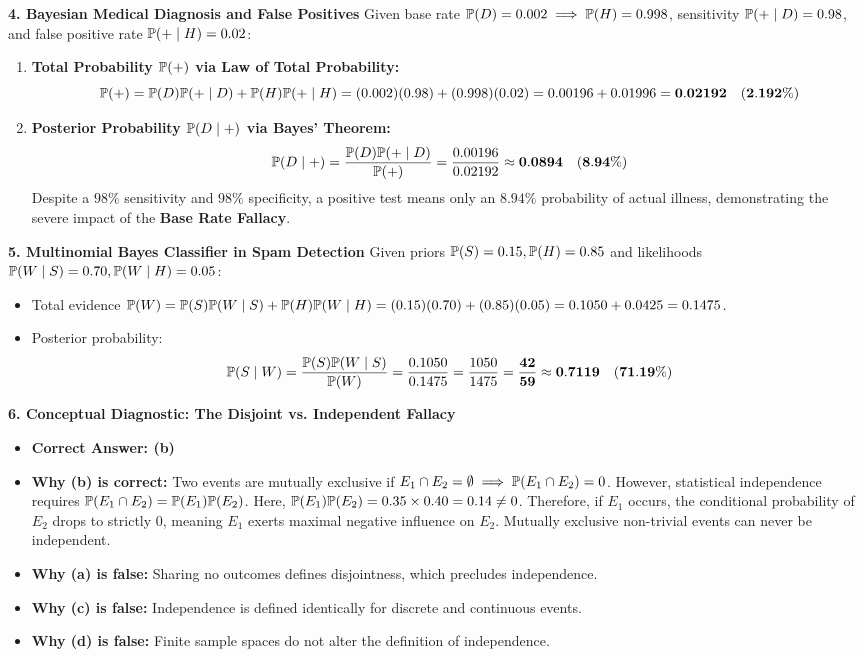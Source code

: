 \textbf{4. Bayesian Medical Diagnosis and False Positives}
Given base rate $\P(D) = 0.002 \implies \P(H) = 0.998$, sensitivity $\P(+ \mid D) = 0.98$, and false positive rate $\P(+ \mid H) = 0.02$:
\begin{enumerate}
    \item \textbf{Total Probability $\P(+)$ via Law of Total Probability:}
    $$\P(+) = \P(D)\P(+ \mid D) + \P(H)\P(+ \mid H) = (0.002)(0.98) + (0.998)(0.02) = 0.00196 + 0.01996 = \mathbf{0.02192 \quad (2.192\%)}$$
    \item \textbf{Posterior Probability $\P(D \mid +)$ via Bayes' Theorem:}
    $$\P(D \mid +) = \frac{\P(D)\P(+ \mid D)}{\P(+)} = \frac{0.00196}{0.02192} \approx \mathbf{0.0894 \quad (8.94\%)}$$
    Despite a $98\%$ sensitivity and $98\%$ specificity, a positive test means only an $8.94\%$ probability of actual illness, demonstrating the severe impact of the \textbf{Base Rate Fallacy}.
\end{enumerate}

\textbf{5. Multinomial Bayes Classifier in Spam Detection}
Given priors $\P(S) = 0.15, \P(H) = 0.85$ and likelihoods $\P(W \mid S) = 0.70, \P(W \mid H) = 0.05$:
\begin{itemize}
    \item Total evidence $\P(W) = \P(S)\P(W \mid S) + \P(H)\P(W \mid H) = (0.15)(0.70) + (0.85)(0.05) = 0.1050 + 0.0425 = 0.1475$.
    \item Posterior probability:
    $$\P(S \mid W) = \frac{\P(S)\P(W \mid S)}{\P(W)} = \frac{0.1050}{0.1475} = \frac{1050}{1475} = \mathbf{\frac{42}{59} \approx 0.7119 \quad (71.19\%)}$$
\end{itemize}

\textbf{6. Conceptual Diagnostic: The Disjoint vs. Independent Fallacy}
\begin{itemize}
    \item \textbf{Correct Answer: (b)}
    \item \textbf{Why (b) is correct:} Two events are mutually exclusive if $E_1 \cap E_2 = \emptyset \implies \P(E_1 \cap E_2) = 0$. However, statistical independence requires $\P(E_1 \cap E_2) = \P(E_1)\P(E_2)$. Here, $\P(E_1)\P(E_2) = 0.35 \times 0.40 = 0.14 \neq 0$. Therefore, if $E_1$ occurs, the conditional probability of $E_2$ drops to strictly $0$, meaning $E_1$ exerts maximal negative influence on $E_2$. Mutually exclusive non-trivial events can never be independent.
    \item \textbf{Why (a) is false:} Sharing no outcomes defines disjointness, which precludes independence.
    \item \textbf{Why (c) is false:} Independence is defined identically for discrete and continuous events.
    \item \textbf{Why (d) is false:} Finite sample spaces do not alter the definition of independence.
\end{itemize}


